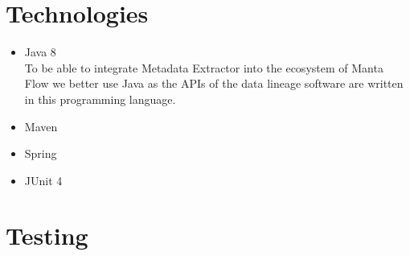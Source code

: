 \section{Technologies}

\begin{itemize}
	\item Java 8 \\
	To be able to integrate Metadata Extractor into the ecosystem of Manta Flow we better use Java as the APIs of the data lineage software are written in this programming language.
	\item Maven 
	\item Spring 
	\item JUnit 4
\end{itemize}

\section{Testing}


\TODO